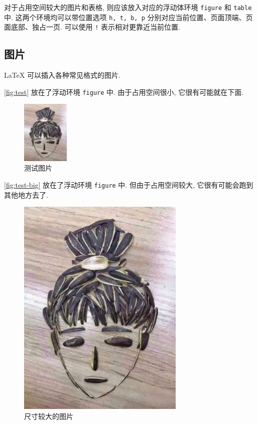 对于占用空间较大的图片和表格, 则应该放入对应的浮动体环境 \verb|figure| 和 \verb|table| 中.
这两个环境均可以带位置选项 \verb|h, t, b, p| 分别对应当前位置、页面顶端、页面底部、独占一页.
可以使用 \verb|!| 表示相对更靠近当前位置.

\subsection{图片}

\LaTeX{} 可以插入各种常见格式的图片.

\autoref{fig:test} 放在了浮动环境 \verb|figure| 中.
由于占用空间很小, 它很有可能就在下面.

\begin{figure}[!htb]
\centering
\includegraphics[height=3cm]{figure/test}
\caption{测试图片}
\label{fig:test}
\end{figure}

\autoref{fig:test-big} 放在了浮动环境 \verb|figure| 中.
但由于占用空间较大, 它很有可能会跑到其他地方去了.

\begin{figure}[!htbp]
\centering
\includegraphics[width=8cm]{figure/test}
\caption{尺寸较大的图片}
\label{fig:test-big}
\end{figure}

